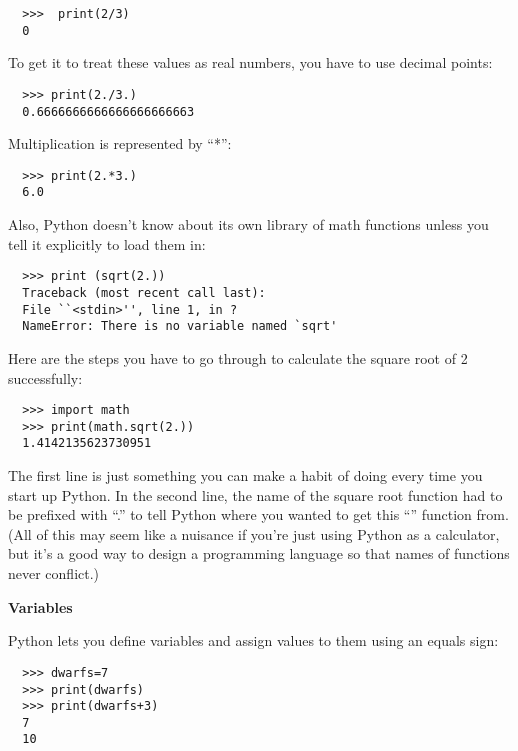 \begin{verbatim}
  >>>  print(2/3)
  0
\end{verbatim}

\noindent{}To get it to treat these values as real numbers, you have to use decimal
points:

\begin{verbatim}
  >>> print(2./3.)
  0.6666666666666666666663
\end{verbatim}

\noindent{}Multiplication is represented by ``*'':

\begin{verbatim}
  >>> print(2.*3.)
  6.0
\end{verbatim}

\noindent{}Also, Python doesn't know about its own library of math functions unless
you tell it explicitly to load them in:

\begin{verbatim}
  >>> print (sqrt(2.))
  Traceback (most recent call last):
  File ``<stdin>'', line 1, in ?
  NameError: There is no variable named `sqrt'
\end{verbatim}

\noindent{}Here are the steps you have to go through to calculate the square root
of 2 successfully:

\begin{verbatim}
  >>> import math
  >>> print(math.sqrt(2.))
  1.4142135623730951
\end{verbatim}

\noindent{}The first line is just something you can make a habit of doing every
time you start up Python. In the second line, the name of the square
root function had to be prefixed with ``\verb@math@.'' to tell Python where you
wanted to get this ``\verb@sqrt@'' function from. (All of this may seem like a
nuisance if you're just using Python as a calculator, but it's a good
way to design a programming language so that names of functions never
conflict.)


\textbf{Variables}

Python lets you define variables and assign values to them using an
equals sign:

\begin{verbatim}
  >>> dwarfs=7
  >>> print(dwarfs)
  >>> print(dwarfs+3)
  7
  10
\end{verbatim}

